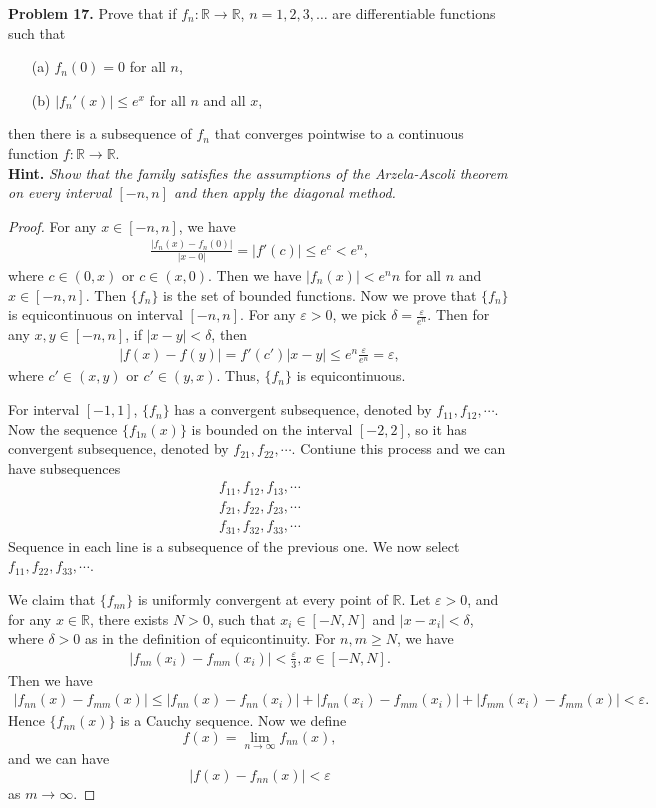 \documentclass[12pt]{article}
\theoremstyle{definition}
\theoremstyle{definition}
\numberwithin{equation}{subsection}
\begin{document}
\noindent
{\bf Problem 17.}
Prove that if $f_n:\mathbb{R}\to\mathbb{R}$, $n=1,2,3,\ldots$ are differentiable functions such that
\begin{enumerate}
\item[(a)] $f_n(0)=0$ for all $n$,
\item[(b)] $|f_n'(x)|\leq e^x$ for all $n$ and all $x$, 
\end{enumerate}
then there is a subsequence of $f_n$ that converges pointwise to a continuous function $f:\mathbb{R}\to\mathbb{R}$.\\
{\bf Hint.} {\em Show that the family satisfies the assumptions of the Arzela-Ascoli theorem on every interval $[-n,n]$ and then apply the diagonal method.}
\begin{proof}
For any $x\in [-n,n]$, we have 
\begin{align*}
    \frac{|f_n(x) - f_n(0)|}{|x - 0|} = |f'(c)| \leq e^c < e^n,
\end{align*}
where $c\in (0,x)$ or $c\in (x,0)$. Then we have $|f_n(x)| < e^n n$ for all $n$ and $x\in [-n,n]$. Then $\{f_n\}$ is the set of bounded functions. Now we prove that $\{f_n\}$ is equicontinuous on interval $[-n,n]$. For any $\varepsilon > 0$, we pick $\delta = \frac{\varepsilon}{e^n}$. Then for any $x, y\in [-n,n]$, if $|x-y| < \delta$, then
\begin{align*}
    |f(x) - f(y)| = f'(c') |x-y| \leq e^n \frac{\varepsilon}{e^n} = \varepsilon,
\end{align*}
where $c' \in (x,y)$ or $c'\in (y,x)$. Thus, $\{f_n\}$ is equicontinuous. 

For interval $[-1,1]$, $\{f_n\}$ has a convergent subsequence, denoted by $f_{11},f_{12},\cdots$. Now the sequence $\{f_{1n}(x)\}$ is bounded on the interval $[-2,2]$, so it has convergent subsequence, denoted by $f_{21}, f_{22}, \cdots$. Contiune this process and we can have subsequences
\begin{align*}
    f_{11},f_{12},f_{13},\cdots \\
    f_{21},f_{22},f_{23},\cdots \\
    f_{31},f_{32},f_{33},\cdots
\end{align*}
Sequence in each line is a subsequence of the previous one. We now select $f_{11}, f_{22}, f_{33},\cdots$. 

We claim that $\{f_{nn}\}$ is uniformly convergent at every point of $\mathbb{R}$. Let $\varepsilon > 0$, and for any $x\in \mathbb{R}$, there exists $N > 0$, such that $x_i\in [-N,N]$ and $|x - x_i| < \delta$, where $\delta > 0$ as in the definition of equicontinuity. For $n,m \geq N$, we have
\begin{align*}
    \left|f_{nn}(x_i) - f_{mm}(x_i)\right| < \frac{\varepsilon}{3}, x\in [-N, N].
\end{align*}
Then we have
\begin{align*}
    |f_{nn}(x) - f_{mm}(x)| \leq |f_{nn}(x) - f_{nn}(x_i)| + |f_{nn}(x_i) - f_{mm}(x_i)| + |f_{mm}(x_i) - f_{mm}(x)| < \varepsilon.
\end{align*}
Hence $\{f_{nn}(x)\}$ is a Cauchy sequence. Now we define $$f(x) = \lim_{n\to\infty}f_{nn}(x),$$
and we can have
$$|f(x) - f_{nn}(x)| < \varepsilon$$
as $m\to\infty$.
\end{proof}
\end{document}
